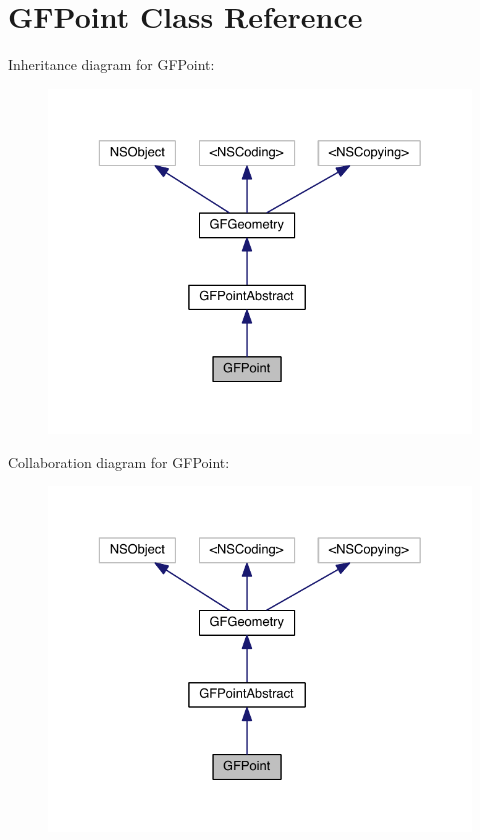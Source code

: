 \hypertarget{interface_g_f_point}{}\section{G\+F\+Point Class Reference}
\label{interface_g_f_point}


Inheritance diagram for G\+F\+Point\+:\nopagebreak
\begin{figure}[H]
\begin{center}
\leavevmode
\includegraphics[width=329pt]{interface_g_f_point__inherit__graph}
\end{center}
\end{figure}


Collaboration diagram for G\+F\+Point\+:\nopagebreak
\begin{figure}[H]
\begin{center}
\leavevmode
\includegraphics[width=329pt]{interface_g_f_point__coll__graph}
\end{center}
\end{figure}
